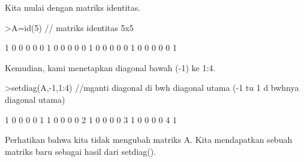 \documentclass[a4paper,10pt]{article}
\begin{document}
\begin{eulernotebook}
\begin{eulercomment}
Kita mulai dengan matriks identitas.
\end{eulercomment}
\begin{eulerprompt}
>A=id(5) // matriks identitas 5x5
\end{eulerprompt}
\begin{euleroutput}
              1             0             0             0             0 
              0             1             0             0             0 
              0             0             1             0             0 
              0             0             0             1             0 
              0             0             0             0             1 
\end{euleroutput}
\begin{eulercomment}
Kemudian, kami menetapkan diagonal bawah (-1) ke 1:4.
\end{eulercomment}
\begin{eulerprompt}
>setdiag(A,-1,1:4) //mganti diagonal di bwh diagonal utama (-1 tu 1 d bwhnya diagonal utama)
\end{eulerprompt}
\begin{euleroutput}
              1             0             0             0             0 
              1             1             0             0             0 
              0             2             1             0             0 
              0             0             3             1             0 
              0             0             0             4             1 
\end{euleroutput}
\begin{eulercomment}
Perhatikan bahwa kita tidak mengubah matriks A. Kita mendapatkan
sebuah matriks baru sebagai hasil dari setdiag().


\end{eulercomment}
\end{eulernotebook}
\end{document}
